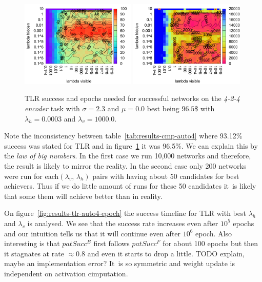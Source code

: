 \begin{figure}[H]
  \centering
  \includegraphics[width=0.49\textwidth]{img/tlr-auto4-success.pdf}   
  \includegraphics[width=0.49\textwidth]{img/tlr-auto4-epoch.pdf}     
  \caption{TLR success and epochs needed for successful networks on the \emph{4-2-4 encoder} task with $\sigma = 2.3$ and $\mu = 0.0$ best being $96.5\$$ with $\lambda_h=0.0003$ and $\lambda_v=1000.0$.}
  \label{fig:results-tlr-auto4-performance}
\end{figure}

Note the inconsistency between table~\ref{tab:results-cmp-auto4} where 93.12\% success was stated for TLR and in figure~\ref{fig:results-tlr-auto4-performance} it was 96.5\%. We can explain this by the \emph{law of big numbers}. In the first case we run 10,000 networks and therefore, the result is likely to mirror the reality. In the second case only 200 networks were run for each$(\lambda_v,\,\lambda_h)$ pairs with having about 50 candidates for best achievers. Thus if we do little amount of runs for these 50 candidates it~is likely that some them will achieve better than in reality. 

On figure~\ref{fig:results-tlr-auto4-epoch} the success timeline for TLR with best $\lambda_h$ and $\lambda_v$ is analysed. We see that the success rate increases even after $10^5$ epochs and our intuition tells us that it will continue even after $10^6$ epoch. Also interesting is that $patSucc^B$ first follows $patSucc^F$ for about 100 epochs but then it stagnates at rate $\approx0.8$ and even it starts to drop a little. TODO explain, maybe an implementation error? It~is so symmetric and weight update is independent on activation cimputation. 

